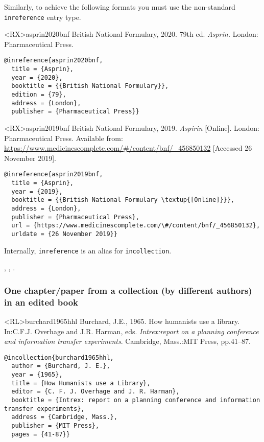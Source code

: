 \documentclass[10pt,a4paper]{article}
\newenvironment{info}{%
  \begin{list}{\makebox[2em][c]{\faInfoCircle}}{%
    \setlength{\leftmargin}{2em}
    \setlength{\labelwidth}{2em}
    \setlength{\labelsep}{0pt}}
}{\end{list}}
\begin{document}
\begin{info}\item
Similarly, to achieve the following formats you must use the non-standard
\texttt{inreference} entry type.
\end{info}

\begin{bibexbox}<RX>{asprin2020bnf}
  British National Formulary, 2020. 79th ed. \emph{Asprin.} London: Pharmaceutical Press.
  \tcblower
\begin{Verbatim}
@inreference{asprin2020bnf,
  title = {Asprin},
  year = {2020},
  booktitle = {{British National Formulary}},
  edition = {79},
  address = {London},
  publisher = {Pharmaceutical Press}}
\end{Verbatim}
\end{bibexbox}

\begin{bibexbox}<RX>{asprin2019bnf}
  British National Formulary, 2019. \emph{Aspirin} [Online]. London: Pharmaceutical Press. Available from: \url{https://www.medicinescomplete.com/\#/content/bnf/_456850132} [Accessed 26 November 2019].
  \tcblower
\begin{Verbatim}
@inreference{asprin2019bnf,
  title = {Asprin},
  year = {2019},
  booktitle = {{British National Formulary \textup{[Online]}}},
  address = {London},
  publisher = {Pharmaceutical Press},
  url = {https://www.medicinescomplete.com/\#/content/bnf/_456850132},
  urldate = {26 November 2019}}
\end{Verbatim}
\end{bibexbox}

\begin{info}\item
Internally, \texttt{inreference} is an alias for \texttt{incollection}.
\end{info}

\citet{bnf2020}, \cite{asprin2019bnf}, \citet{asprin2020bnf}.

\subsubsection*{One chapter\slash paper from a collection (by different authors) in an edited book}

\begin{bibexbox}<RL>{burchard1965hhl}
  Burchard, J.E., 1965. How humanists use a library. In:\@ C.F.J. Overhage and J.R. Harman, eds. \emph{Intrex:\@ report on a planning conference and information transfer experiments}. Cambridge, Mass.:\@ MIT Press, pp.41--87.
  \tcblower
\begin{Verbatim}
@incollection{burchard1965hhl,
  author = {Burchard, J. E.},
  year = {1965},
  title = {How Humanists use a Library},
  editor = {C. F. J. Overhage and J. R. Harman},
  booktitle = {Intrex: report on a planning conference and information transfer experiments},
  address = {Cambridge, Mass.},
  publisher = {MIT Press},
  pages = {41-87}}
\end{Verbatim}
\end{bibexbox}
\end{document}
